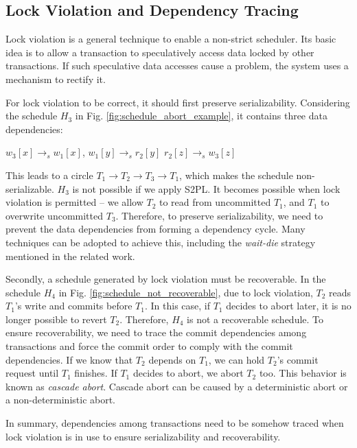 \documentclass[conference]{IEEEtran}
\begin{document}
\subsection{Lock Violation and Dependency Tracing}

Lock violation is a general technique to enable a non-strict scheduler.
Its basic idea is to allow a transaction to speculatively access data locked by other transactions.
If such speculative data accesses cause a problem, the system uses a mechanism to rectify it.

For lock violation to be correct, it should first preserve serializability.
Considering the schedule ${H_3}$ in Fig. \ref{fig:schedule_abort_example},
it contains three data dependencies:

\begin{center}
${w_3[x] \rightarrow _s w_1[x]}$,
${w_1[y] \rightarrow _s r_2[y]}$
${r_2[z] \rightarrow _s w_3[z]}$
\end{center}

This leads to a circle ${T_1 \rightarrow T_2 \rightarrow T_3 \rightarrow T_1}$, which makes the schedule non-serializable.
${H_3}$ is not possible if we apply S2PL.
It becomes possible when lock violation is permitted -- we allow ${T_2}$ to read from uncommitted ${T_1}$, and ${T_1}$ to overwrite uncommitted ${T_3}$.
Therefore, to preserve serializability, we need to prevent the data dependencies from forming a dependency cycle.
Many techniques can be adopted to achieve this, including the \emph{wait-die} strategy mentioned in the related work.

Secondly, a schedule generated by lock violation must be recoverable.
In the schedule ${H_4}$ in Fig.   \ref{fig:schedule_not_recoverable}, due to lock violation,
${T_2}$ reads  ${T_1}$'s write and commits before ${T_1}$.
In this case, if ${T_1}$ decides to abort later, it is no longer possible to revert ${T_2}$.
Therefore, ${H_4}$ is not a recoverable schedule.
To ensure recoverability, we need to trace the commit dependencies among transactions and force the commit order to comply with the commit dependencies.
If we know that ${T_2}$ depends on ${T_1}$, we can hold ${T_2}$'s commit request until ${T_1}$ finishes.
If ${T_1}$ decides to abort, we abort ${T_2}$ too.
This behavior is known as \emph{cascade abort}.
Cascade abort can be caused by a deterministic abort or a non-deterministic abort.

In summary, dependencies among transactions need to be somehow traced when lock violation is in use to ensure serializability and recoverability.
\end{document}
